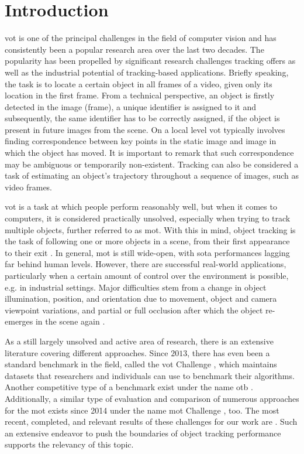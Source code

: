 \chapter{Introduction}
\label{chap:Introduction}

\Gls{vot} is one of the principal challenges in the field of computer vision and has consistently been a popular research area over the last two decades. The popularity has been propelled by significant research challenges tracking offers as well as the industrial potential of tracking-based applications. Briefly speaking, the task is to locate a certain object in all frames of a video, given only its location in the first frame. From a technical perspective, an object is firstly detected in the image (frame), a unique identifier is assigned to it and subsequently, the same identifier has to be correctly assigned, if the object is present in future images from the scene. On a local level \gls{vot} typically involves finding correspondence between key points in the static image and image in which the object has moved. It is important to remark that such correspondence may be ambiguous or temporarily non-existent. Tracking can also be considered a task of estimating an object’s trajectory throughout a sequence of images, such as video frames.

\Gls{vot} is a task at which people perform reasonably well, but when it comes to computers, it is considered practically unsolved, especially when trying to track multiple objects, further referred to as \gls{mot}. With this in mind, object tracking is the task of following one or more objects in a scene, from their first appearance to their exit \cite{forsyth2002computer}. In general, \gls{mot} is still wide-open, with \gls{sota} performances lagging far behind human levels. However, there are successful real-world applications, particularly when a certain amount of control over the environment is possible, e.g. in industrial settings. Major difficulties stem from a change in object illumination, position, and orientation due to movement, object and camera viewpoint variations, and partial or full occlusion after which the object re-emerges in the scene again \cite{Jalal2012}.

As a still largely unsolved and active area of research, there is an extensive literature covering different approaches. Since $2013$, there has even been a standard benchmark in the field, called the \gls{vot} Challenge \cite{votchallenge}, which maintains datasets that researchers and individuals can use to benchmark their algorithms. Another competitive type of a benchmark exist under the name \gls{otb} \cite{objecttrackingbenchmark}. Additionally, a similar type of evaluation and comparison of numerous approaches for the \gls{mot} exists since 2014 under the name \gls{mot} Challenge \cite{motchallenge}, too. The most recent, completed, and relevant results of these challenges for our work are \cite{Kristan2018, Kristan2019a, Dendorfer2019}. Such an extensive endeavor to push the boundaries of object tracking performance supports the relevancy of this topic.

